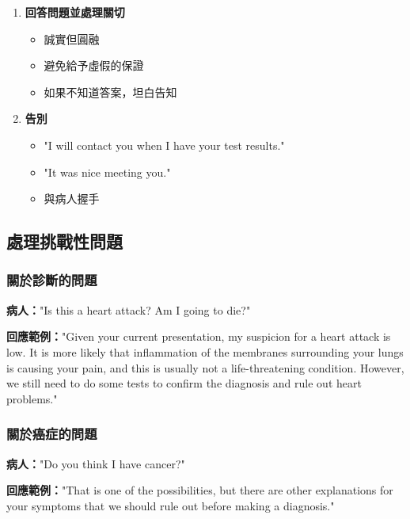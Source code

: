 \documentclass[12pt,a4paper]{article}
\begin{document}
\begin{enumerate}
    \item \textbf{回答問題並處理關切}
    \begin{itemize}
        \item 誠實但圓融
        \item 避免給予虛假的保證
        \item 如果不知道答案，坦白告知
    \end{itemize}
    
    \item \textbf{告別}
    \begin{itemize}
        \item "I will contact you when I have your test results."
        \item "It was nice meeting you."
        \item 與病人握手
    \end{itemize}
\end{enumerate}

\subsection{處理挑戰性問題}

\subsubsection{關於診斷的問題}

\begin{tcolorbox}[colback=highlight_yellow,colframe=emergency_gray]
\textbf{病人：}"Is this a heart attack? Am I going to die?"

\textbf{回應範例：}"Given your current presentation, my suspicion for a heart attack is low. It is more likely that inflammation of the membranes surrounding your lungs is causing your pain, and this is usually not a life-threatening condition. However, we still need to do some tests to confirm the diagnosis and rule out heart problems."
\end{tcolorbox}

\subsubsection{關於癌症的問題}

\begin{tcolorbox}[colback=highlight_yellow,colframe=emergency_gray]
\textbf{病人：}"Do you think I have cancer?"

\textbf{回應範例：}"That is one of the possibilities, but there are other explanations for your symptoms that we should rule out before making a diagnosis."
\end{tcolorbox}
\end{document}
